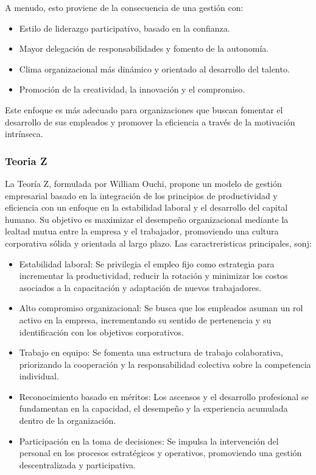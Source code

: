 \documentclass[a4paper,oneside,11pt]{article}
\begin{document}
A menudo, esto proviene de la consecuencia de una gestión con:


\begin{itemize}
    \item Estilo de liderazgo participativo, basado en la confianza.
    \item Mayor delegación de responsabilidades y fomento de la autonomía.
    \item Clima organizacional más dinámico y orientado al desarrollo del talento.
    \item Promoción de la creatividad, la innovación y el compromiso.
\end{itemize}

Este enfoque es más adecuado para organizaciones que buscan fomentar el desarrollo de sus empleados y promover la eficiencia a través de la motivación intrínseca.

\subsubsection{Teoria Z}

La Teoría Z, formulada por William Ouchi, propone un modelo de gestión empresarial basado en la integración de los principios de productividad y eficiencia con un enfoque en la estabilidad laboral y el desarrollo del capital humano. Su objetivo es maximizar el desempeño organizacional mediante la lealtad mutua entre la empresa y el trabajador, promoviendo una cultura corporativa sólida y orientada al largo plazo. Las caractreristicas principales, sonj:

\begin{itemize}
    \item Estabilidad laboral: Se privilegia el empleo fijo como estrategia para incrementar la productividad, reducir la rotación y minimizar los costos asociados a la capacitación y adaptación de nuevos trabajadores.
    \item Alto compromiso organizacional: Se busca que los empleados asuman un rol activo en la empresa, incrementando su sentido de pertenencia y su identificación con los objetivos corporativos.
    \item Trabajo en equipo: Se fomenta una estructura de trabajo colaborativa, priorizando la cooperación y la responsabilidad colectiva sobre la competencia individual.
    \item Reconocimiento basado en méritos: Los ascensos y el desarrollo profesional se fundamentan en la capacidad, el desempeño y la experiencia acumulada dentro de la organización.
    \item Participación en la toma de decisiones: Se impulsa la intervención del personal en los procesos estratégicos y operativos, promoviendo una gestión descentralizada y participativa.
\end{itemize}
\end{document}
